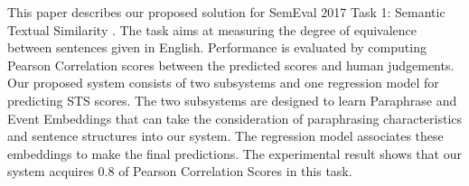 This paper describes our proposed solution for SemEval 2017 Task 1: Semantic Textual Similarity \cite{semeval2017}. The task aims at measuring the degree of equivalence between sentences given in English. Performance is evaluated by computing Pearson Correlation scores between the predicted scores and human judgements. Our proposed system consists of two subsystems and one regression model for predicting STS scores. The two subsystems are designed to learn Paraphrase and Event Embeddings that can take the consideration of paraphrasing characteristics and sentence structures into our system. The regression model associates these embeddings to make the final predictions. The experimental result shows that our system acquires 0.8 of Pearson Correlation Scores in this task.

